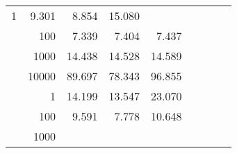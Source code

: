 \begin{table}
\begin{tabular}{rrrrrrrrr}
					\multirow{ 1 }{*}{ 1 } &
					
						
							    
							    
	                           9.301 & 8.854 & 15.080  \\
	                
	            
					 &  
					 
					\multirow{ 1 }{*}{ 100 } &
					
						
							    
							    
	                           7.339 & 7.404 & 7.437  \\
	                
	            
					 &  
					 
					\multirow{ 1 }{*}{ 1000 } &
					
						
							    
							    
	                           14.438 & 14.528 & 14.589  \\
	                
	            
					 &  
					 
					\multirow{ 1 }{*}{ 10000 } &
					
						
							    
							    
	                           89.697 & 78.343 & 96.855  \\
	                
	            
	        
				\noalign{\smallskip}\hline
				\multirow{ 4 }{*}{ 160000 } &
				
					
					 
					\multirow{ 1 }{*}{ 1 } &
					
						
							    
							    
	                           14.199 & 13.547 & 23.070  \\
	                
	            
					 &  
					 
					\multirow{ 1 }{*}{ 100 } &
					
						
							    
							    
	                           9.591 & 7.778 & 10.648  \\
	                
	            
					 &  
					 
					\multirow{ 1 }{*}{ 1000 } &
					
						
							    

\end{tabular}
\end{table}
